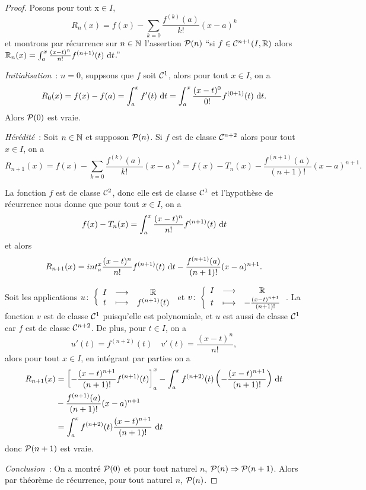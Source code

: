 \begin{proof}
  Posons pour tout x\( \in I\),
  \begin{equation}
    R_n(x) = f(x) -\sum_{k = 0}\frac{f^{(k)}(a)}{k!} (x-a)^k
  \end{equation}
  et montrons par récurrence sur \(n \in \N\) l'assertion \(\P(n)\) ``si \(f \in 
  \classe{n+1}(I,\R)\) alors \(\R_n(x) = \int_a^x \frac{(x-t)^n}{n!} 
  f^{(n+1)}(t)\,\diff t\).''

  \emph{Initialisation}~: \(n = 0\), suppsons que \(f\) soit \(\classe{1}\), alors 
  pour tout \(x \in I\), on a
  \begin{equation}
    R_0(x) = f(x)-f(a) = \int_a^x f'(t)\,\diff t = \int_a^x 
    \frac{(x-t)^0}{0!}f^{(0+1)}(t)\,\diff t.
  \end{equation}
  Alors \(\P(0)\) est vraie.

  \emph{Hérédité}~: Soit \(n \in \N\) et supposon \(\P(n)\). Si \(f\) est de 
  classe \(\classe{n+2}\) alors pour tout \(x \in I\), on a
  \begin{equation}
    R_{n+1}(x) = f(x) - \sum_{k = 0}\frac{f^{(k)}(a)}{k!} (x-a)^k = f(x) - T_n(x) - 
    \frac{f^{(n+1)}(a)}{(n+1)!}(x-a)^{n+1}.
  \end{equation}

  La fonction \(f\) est de classe \(\classe{2}\), donc elle est de classe 
  \(\classe{1}\) et l'hypothèse de récurrence nous donne que pour tout \(x \in 
  I\), on a
  \begin{equation}
    f(x) - T_n(x) = \int_a^x \frac{(x-t)^n}{n!} f^{(n+1)}(t)\,\diff t
  \end{equation}
  et alors
  \begin{equation}
    R_{n+1}(x) = int_a^x \frac{(x-t)^n}{n!} f^{(n+1)}(t)\,\diff t - 
    \frac{f^{(n+1)}(a)}{(n+1)!}(x-a)^{n+1}.
  \end{equation}

  Soit les applications \(\fonction{u}{I}{\R}{t}{f^{(n+1)}(t)}\) et 
  \(\fonction{v}{I}{\R}{t}{-\frac{(x-t)^{n+1}}{(n+1)!}}\). La fonction \(v\) est 
  de classe \(\classe{1}\) puisqu'elle est polynomiale, et \(u\) est aussi de 
  classe \(\classe{1}\) car \(f\) est de classe \(\classe{n+2}\). De plus, pour 
  \(t \in I\), on a
  \begin{equation}
    u'(t) = f^{(n+2)}(t) \quad v'(t) = \frac{(x-t)^n}{n!},
  \end{equation}
  alors pour tout \(x \in I\), en intégrant par parties on a
  \begin{align*}
    R_{n+1}(x)& = \left[ -\frac{(x-t)^{n+1}}{(n+1)!}f^{(n+1)}(t)\right]_a^x - 
    \int_a^x f^{(n+2)}(t)\left(-\frac{(x-t)^{n+1}}{(n+1)!}\right)\,\diff t \\ &- 
    \frac{f^{(n+1)}(a)}{(n+1)!}(x-a)^{n+1} \notag \\
    &= \int_a^x f^{(n+2)}(t) \frac{(x-t)^{n+1}}{(n+1)!}\,\diff t
  \end{align*}
  donc \(\P(n+1)\) est vraie.

  \emph{Conclusion}~: On a montré \(\P(0)\) et pour tout naturel \(n\), \(\P(n) 
  \Rightarrow \P(n+1)\). Alors par théorème de récurrence, pour tout naturel 
  \(n\), \(\P(n)\).
\end{proof}

